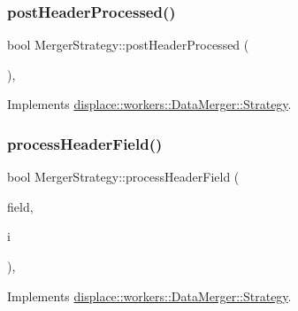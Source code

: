 \mbox{\label{classdisplace_1_1workers_1_1_merger_strategy_a13652dd462cd7e666222952d84963132}} 
\subsubsection{\texorpdfstring{postHeaderProcessed()}{postHeaderProcessed()}}
{\footnotesize\ttfamily bool Merger\+Strategy\+::post\+Header\+Processed (\begin{DoxyParamCaption}{ }\end{DoxyParamCaption})\hspace{0.3cm}{\ttfamily [override]}, {\ttfamily [virtual]}}



Implements \mbox{\hyperlink{classdisplace_1_1workers_1_1_data_merger_1_1_strategy_a2ef649650a70b8f1b60ccfe432e6ab5e}{displace\+::workers\+::\+Data\+Merger\+::\+Strategy}}.

\mbox{\label{classdisplace_1_1workers_1_1_merger_strategy_a5cfb5bda0541f3f7659aa13e0240fc57}} 
\subsubsection{\texorpdfstring{processHeaderField()}{processHeaderField()}}
{\footnotesize\ttfamily bool Merger\+Strategy\+::process\+Header\+Field (\begin{DoxyParamCaption}\item[{Q\+String}]{field,  }\item[{int}]{i }\end{DoxyParamCaption})\hspace{0.3cm}{\ttfamily [override]}, {\ttfamily [virtual]}}



Implements \mbox{\hyperlink{classdisplace_1_1workers_1_1_data_merger_1_1_strategy_a00c094e55d6d8413710368af55c55224}{displace\+::workers\+::\+Data\+Merger\+::\+Strategy}}.

